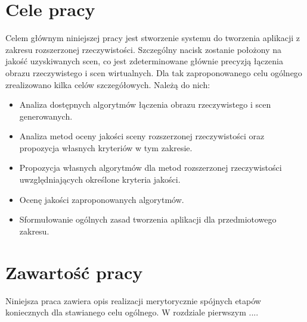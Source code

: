 
\section{Cele pracy}
\label{sec:celePracy}

Celem głównym niniejszej pracy jest stworzenie systemu do tworzenia aplikacji z zakresu rozszerzonej rzeczywistości. Szczególny nacisk zostanie położony na jakość uzyskiwanych scen, co jest zdeterminowane głównie precyzją łączenia obrazu rzeczywistego i scen wirtualnych. Dla tak zaproponowanego celu ogólnego zrealizowano kilka celów szczegółowych. Należą do nich:
\begin{itemize}
	\item Analiza dostępnych algorytmów łączenia obrazu rzeczywistego i scen generowanych.
	\item Analiza metod oceny jakości sceny rozszerzonej rzeczywistości oraz propozycja własnych kryteriów w tym zakresie.
	\item Propozycja własnych algorytmów dla metod rozszerzonej rzeczywistości uwzględniających określone kryteria jakości.
	\item Ocenę jakości zaproponowanych algorytmów.
	\item Sformułowanie ogólnych zasad tworzenia aplikacji dla przedmiotowego zakresu.
\end{itemize}


\section{Zawartość pracy}
\label{sec:zawartoscPracy}

Niniejsza praca zawiera opis realizacji merytorycznie spójnych etapów koniecznych dla stawianego celu ogólnego. W rozdziale pierwszym ....


